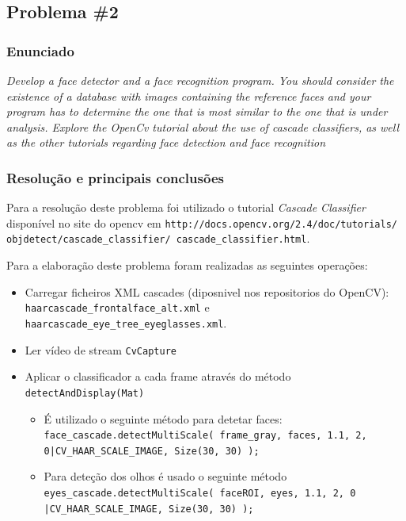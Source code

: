 \documentclass[portuguese, times, mirror]{revdetua}
\begin{document}
\newpage
\subsection{Problema \#2}

\subsubsection{Enunciado}
\textit{Develop a face detector and a face recognition program. You should consider the existence of a database with images containing the reference faces and your program has to determine the one that is most similar to the one that is under analysis.
Explore the OpenCv tutorial about the use of cascade classifiers, as well as the other tutorials regarding face detection and face recognition}


\subsubsection{Resolução e principais conclusões}

Para a resolução deste problema foi utilizado o tutorial \textit{Cascade Classifier} disponível no site do opencv em \texttt{http://docs.opencv.org/2.4/doc/tutorials/
objdetect/cascade\_classifier/
cascade\_classifier.html}. 

Para a elaboração deste problema foram realizadas as seguintes operações: 
\begin{itemize}
    \item Carregar ficheiros XML cascades (diposnivel nos repositorios do OpenCV): \texttt{haarcascade\_frontalface\_alt.xml} e \texttt{haarcascade\_eye\_tree\_eyeglasses.xml}. 
    \item Ler vídeo de stream \texttt{CvCapture}
    \item Aplicar o classificador a cada frame através do método \texttt{detectAndDisplay(Mat)}
    
    \begin{itemize}
        \item É utilizado o seguinte método para detetar  faces: \texttt{face\_cascade.detectMultiScale( frame\_gray, faces, 1.1, 2, 0|CV\_HAAR\_SCALE\_IMAGE, Size(30, 30) );}
        
        \item Para deteção dos olhos é usado o seguinte método \texttt{eyes\_cascade.detectMultiScale( faceROI, eyes, 1.1, 2, 0 |CV\_HAAR\_SCALE\_IMAGE, Size(30, 30) );}
    \end{itemize}
\end{itemize}
\end{document}
